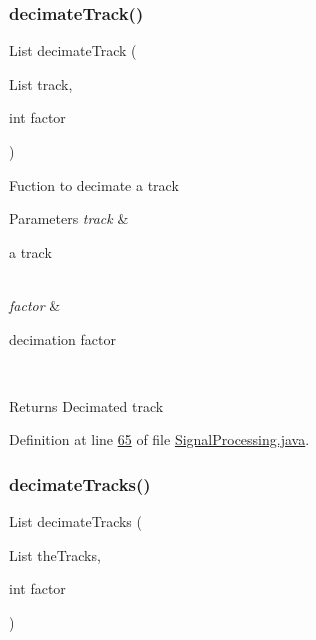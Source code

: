 \subsubsection{\texorpdfstring{decimate\+Track()}{decimateTrack()}}
{\footnotesize\ttfamily List decimate\+Track (\begin{DoxyParamCaption}\item[{List}]{track,  }\item[{int}]{factor }\end{DoxyParamCaption})}

Fuction to decimate a track


\begin{DoxyParams}{Parameters}
{\em track} & 
\begin{DoxyItemize}
\item a track 
\end{DoxyItemize}\\
\hline
{\em factor} & 
\begin{DoxyItemize}
\item decimation factor 
\end{DoxyItemize}\\
\hline
\end{DoxyParams}
\begin{DoxyReturn}{Returns}
Decimated track 
\end{DoxyReturn}


Definition at line \hyperlink{_signal_processing_8java_source_l00065}{65} of file \hyperlink{_signal_processing_8java_source}{Signal\+Processing.\+java}.

\hypertarget{classfunctions_1_1_signal_processing_a3681b0de9ff6ff95edd91bab486627e5}{}\label{classfunctions_1_1_signal_processing_a3681b0de9ff6ff95edd91bab486627e5} 
\subsubsection{\texorpdfstring{decimate\+Tracks()}{decimateTracks()}}
{\footnotesize\ttfamily List decimate\+Tracks (\begin{DoxyParamCaption}\item[{List}]{the\+Tracks,  }\item[{int}]{factor }\end{DoxyParamCaption})}

